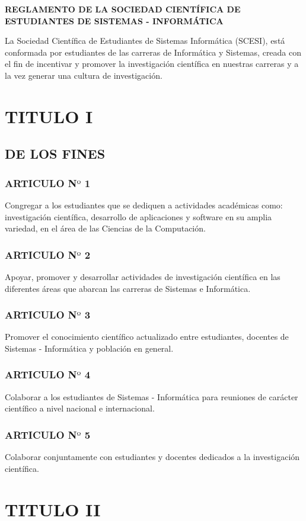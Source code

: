 \documentclass[11pt,letterpaper]{book}
\begin{document}
\begin{center}
{\bf REGLAMENTO DE LA SOCIEDAD CIENTÍFICA DE ESTUDIANTES DE SISTEMAS - INFORMÁTICA}
\end{center}
La Sociedad Científica de Estudiantes de Sistemas Informática (SCESI), está conformada por estudiantes de las carreras de Informática y Sistemas, creada con el fin de incentivar y promover la investigación científica en nuestras carreras y a la vez generar una cultura de investigación.
\section*{TITULO I}
\subsection*{DE LOS FINES}
\subsubsection*{ARTICULO N$º$ 1}
Congregar a los estudiantes que se dediquen a actividades académicas como: investigación científica, desarrollo de aplicaciones y software en su amplia variedad, en el área de las Ciencias de la Computación.
\subsubsection*{ARTICULO N$º$ 2}
Apoyar, promover y desarrollar actividades de investigación científica en las diferentes áreas que abarcan las carreras de Sistemas e Informática.
\subsubsection*{ARTICULO N$º$ 3}
Promover el conocimiento científico actualizado entre estudiantes, docentes de Sistemas - Informática y población en general.
\subsubsection*{ARTICULO N$º$ 4}
Colaborar a los estudiantes de Sistemas - Informática para reuniones de carácter científico a nivel nacional e internacional.
\subsubsection*{ARTICULO N$º$ 5}
Colaborar  conjuntamente con estudiantes y docentes dedicados a la investigación científica.
\newpage
\section*{TITULO II}
\end{document}

